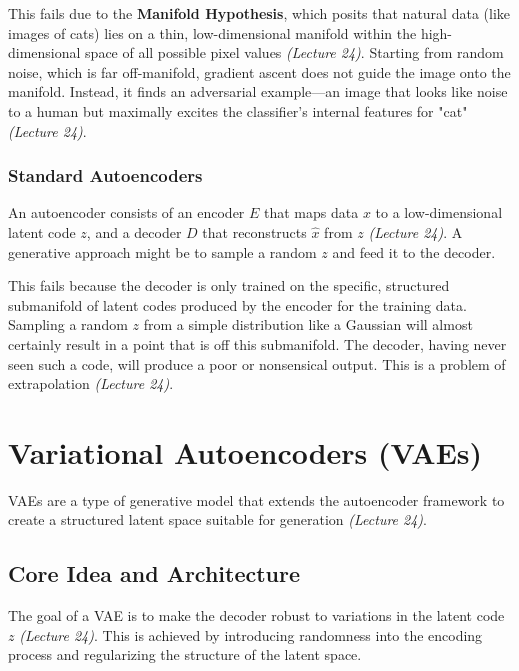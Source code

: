 \documentclass[11pt]{article}
\begin{document}
This fails due to the \textbf{Manifold Hypothesis}, which posits that natural data (like images of cats) lies on a thin, low-dimensional manifold within the high-dimensional space of all possible pixel values \textit{(Lecture 24)}. Starting from random noise, which is far off-manifold, gradient ascent does not guide the image onto the manifold. Instead, it finds an adversarial example—an image that looks like noise to a human but maximally excites the classifier's internal features for "cat" \textit{(Lecture 24)}.

\subsubsection{Standard Autoencoders}
An autoencoder consists of an encoder $E$ that maps data $x$ to a low-dimensional latent code $z$, and a decoder $D$ that reconstructs $\hat{x}$ from $z$ \textit{(Lecture 24)}. A generative approach might be to sample a random $z$ and feed it to the decoder.

This fails because the decoder is only trained on the specific, structured submanifold of latent codes produced by the encoder for the training data. Sampling a random $z$ from a simple distribution like a Gaussian will almost certainly result in a point that is off this submanifold. The decoder, having never seen such a code, will produce a poor or nonsensical output. This is a problem of extrapolation \textit{(Lecture 24)}.

\section{Variational Autoencoders (VAEs)}
VAEs are a type of generative model that extends the autoencoder framework to create a structured latent space suitable for generation \textit{(Lecture 24)}.

\subsection{Core Idea and Architecture}
The goal of a VAE is to make the decoder robust to variations in the latent code $z$ \textit{(Lecture 24)}. This is achieved by introducing randomness into the encoding process and regularizing the structure of the latent space.
\end{document}
